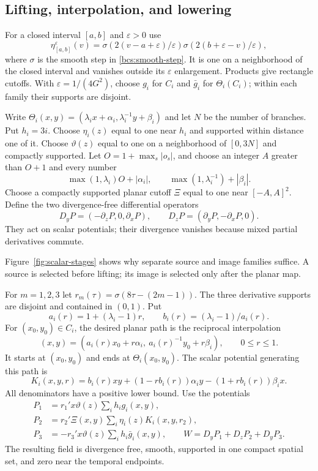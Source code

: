 \subsection{Lifting, interpolation, and lowering}
For a closed interval $[a,b]$ and $\varepsilon>0$ use
\[
 \eta_{[a,b]}^\varepsilon(v)=
 \sigma(2(v-a+\varepsilon)/\varepsilon)
 \sigma(2(b+\varepsilon-v)/\varepsilon),
\]
where $\sigma$ is the smooth step in \eqref{bcs:smooth-step}. It is one on a neighborhood of the closed interval and vanishes outside its $\varepsilon$ enlargement. Products give rectangle cutoffs. With $\varepsilon=1/(4G^2)$, choose $g_i$ for $C_i$ and $\bar g_i$ for $\Theta_i(C_i)$; within each family their supports are disjoint.

Write $\Theta_i(x,y)=(\lambda_i x+\alpha_i,\lambda_i^{-1}y+\beta_i)$ and let $N$ be the number of branches. Put $h_i=3i$. Choose $\eta_i(z)$ equal to one near $h_i$ and supported within distance one of it. Choose $\vartheta(z)$ equal to one on a neighborhood of $[0,3N]$ and compactly supported. Let $O=1+\max_s|o_s|$, and choose an integer $A$ greater than $O+1$ and every number
\[
 \max(1,\lambda_i)O+|\alpha_i|,\qquad
 \max(1,\lambda_i^{-1})+|\beta_i|.
\]
Choose a compactly supported planar cutoff $\Xi$ equal to one near $[-A,A]^2$. Define the two divergence-free differential operators
\[
 D_yP=(-\partial_zP,0,\partial_xP),\qquad
 D_zP=(\partial_yP,-\partial_xP,0).
\]
They act on scalar potentials; their divergence vanishes because mixed partial derivatives commute.

Figure~\ref{fig:scalar-stages} shows why separate source and image families suffice. A source is selected before lifting; its image is selected only after the planar map.


For $m=1,2,3$ let $r_m(\tau)=\sigma(8\tau-(2m-1))$. The three derivative supports are disjoint and contained in $(0,1)$. Put
\[
 a_i(r)=1+(\lambda_i-1)r,\qquad b_i(r)=(\lambda_i-1)/a_i(r).
\]
For $(x_0,y_0)\in C_i$, the desired planar path is the reciprocal interpolation
\begin{equation}\label{bcs:scalar-path}
 (x,y)=(a_i(r)x_0+r\alpha_i,\ a_i(r)^{-1}y_0+r\beta_i),
 \qquad 0\le r\le1.
\end{equation}
It starts at $(x_0,y_0)$ and ends at $\Theta_i(x_0,y_0)$.
The scalar potential generating this path is
\[
 K_i(x,y,r)=b_i(r)xy+(1-rb_i(r))\alpha_i y
                         -(1+rb_i(r))\beta_i x.
\]
All denominators have a positive lower bound. Use the potentials
\begin{align*}
 P_1&=r_1' x\vartheta(z)\sum_i h_i g_i(x,y),\\
 P_2&=r_2'\Xi(x,y)\sum_i\eta_i(z)K_i(x,y,r_2),\\
 P_3&=-r_3' x\vartheta(z)\sum_i h_i\bar g_i(x,y),\qquad
 W=D_yP_1+D_zP_2+D_yP_3.
\end{align*}
The resulting field is divergence free, smooth, supported in one compact spatial set, and zero near the temporal endpoints.

